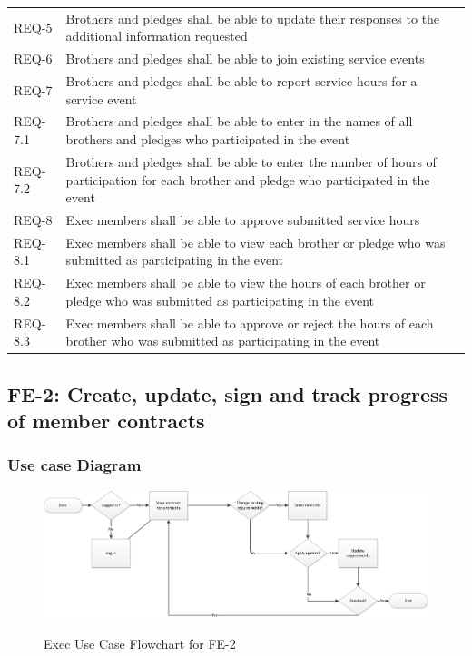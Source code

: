 \documentclass{article}
\newcommand{\req}[1]{REQ-{#1}}
\begin{document}
\FloatBarrier
\newpage
\FloatBarrier
\begin{tabular}{lp{8cm}}
\req{5} & Brothers and pledges shall be able to update their responses
to the additional information requested\\
\req{6} & Brothers and pledges shall be able to join existing service
events \\
\req{7} & Brothers and pledges shall be able to report service hours
for a service event \\
\req{7.1} & Brothers and pledges shall be able to enter in the names
of all brothers and pledges who participated in the event\\
\req{7.2} & Brothers and pledges shall be able to enter the number of
hours of participation for
each brother and pledge who participated in the event\\
\req{8} & Exec members shall be able to approve submitted service
hours\\
\req{8.1} & Exec members shall be able to view each brother or pledge who was
submitted as participating in the event\\
\req{8.2} & Exec members shall be able to view the hours of each brother
or pledge
who was  submitted as participating in the event\\
\req{8.3} & Exec members shall be able to approve or reject the hours
of each brother who was submitted as participating in the event\\
\end{tabular}

\subsection{FE-2: Create, update, sign and track progress of member
  contracts}

\subsubsection{Use case Diagram}

\FloatBarrier
\begin{figure}
\centering
\caption{Exec Use Case Flowchart for FE-2}
\includegraphics[scale=.75]{img/execUseCaseFE2.png}
\label{fig:execUseCaseFE2}
\end{figure}
\FloatBarrier
\end{document}
